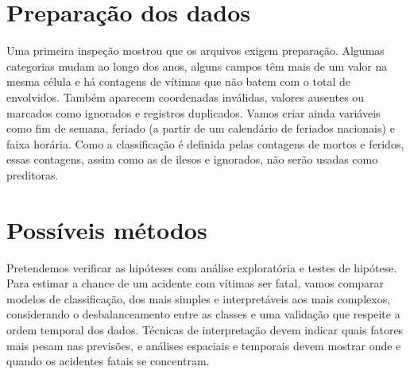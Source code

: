 \documentclass[11pt,a4paper]{article}
\begin{document}
\section*{Preparação dos dados}

Uma primeira inspeção mostrou que os arquivos exigem preparação. Algumas categorias mudam ao longo dos anos, alguns campos têm mais de um valor na mesma célula e há contagens de vítimas que não batem com o total de envolvidos. Também aparecem coordenadas inválidas, valores ausentes ou marcados como ignorados e registros duplicados. Vamos criar ainda variáveis como fim de semana, feriado (a partir de um calendário de feriados nacionais) e faixa horária. Como a classificação é definida pelas contagens de mortos e feridos, essas contagens, assim como as de ilesos e ignorados, não serão usadas como preditoras.

\section*{Possíveis métodos}

Pretendemos verificar as hipóteses com análise exploratória e testes de hipótese. Para estimar a chance de um acidente com vítimas ser fatal, vamos comparar modelos de classificação, dos mais simples e interpretáveis aos mais complexos, considerando o desbalanceamento entre as classes e uma validação que respeite a ordem temporal dos dados. Técnicas de interpretação devem indicar quais fatores mais pesam nas previsões, e análises espaciais e temporais devem mostrar onde e quando os acidentes fatais se concentram.
\end{document}
